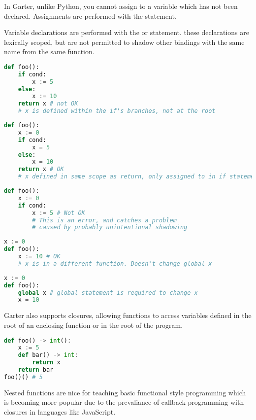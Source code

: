 In Garter, unlike Python, you cannot assign to a variable which has not been
declared. Assignments are performed with the  statement. 

Variable declarations are performed with the  or 
statement. these declarations are lexically scoped, but are not permitted
to shadow other bindings with the same name from the same function.

\begin{lstlisting}[language=Python]
def foo():
    if cond:
        x := 5
    else:
        x := 10
    return x # not OK
    # x is defined within the if's branches, not at the root
\end{lstlisting}

\begin{lstlisting}[language=Python]
def foo():
    x := 0
    if cond:
        x = 5
    else:
        x = 10
    return x # OK
    # x defined in same scope as return, only assigned to in if statements
\end{lstlisting}

\begin{lstlisting}[language=Python]
def foo():
    x := 0
    if cond:
        x := 5 # Not OK
        # This is an error, and catches a problem
        # caused by probably unintentional shadowing
\end{lstlisting}

\begin{lstlisting}[language=Python]
x := 0
def foo():
    x := 10 # OK
    # x is in a different function. Doesn't change global x
\end{lstlisting}

\begin{lstlisting}[language=Python]
x := 0
def foo():
    global x # global statement is required to change x
    x = 10
\end{lstlisting}

Garter also supports closures, allowing functions to access variables defined
in the root of an enclosing function or in the root of the program.

\begin{lstlisting}[language=Python]
def foo() -> int():
    x := 5
    def bar() -> int:
        return x
    return bar
foo()() # 5
\end{lstlisting}

Nested functions are nice for teaching basic functional style programming which
is becoming more popular due to the prevaliance of callback programming with
closures in languages like JavaScript.

